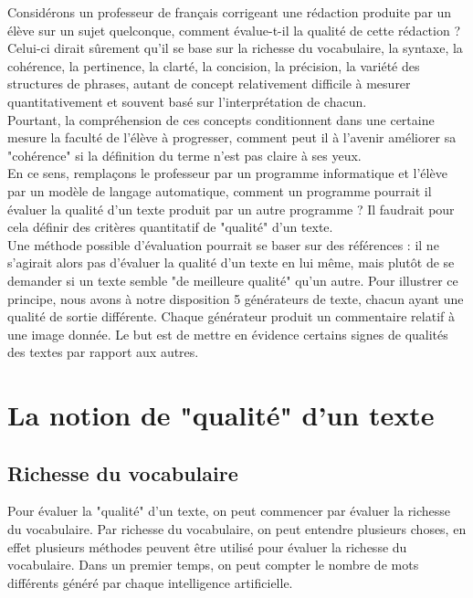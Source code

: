 \documentclass[conference]{IEEEtran}
\begin{document}
Considérons un professeur de français corrigeant une rédaction produite par un élève sur un sujet quelconque, comment évalue-t-il la qualité de cette rédaction ? 
Celui-ci dirait sûrement qu'il se base sur la richesse du vocabulaire, la syntaxe, la cohérence, la pertinence, la clarté, la concision, la précision, la variété des structures de phrases, autant de concept relativement difficile à mesurer quantitativement et souvent basé sur l'interprétation de chacun. \\

Pourtant, la compréhension de ces concepts conditionnent dans une certaine mesure la faculté de l'élève à progresser, comment peut il à l'avenir améliorer sa "cohérence" si la définition du terme n'est pas claire à ses yeux.\\

En ce sens, remplaçons le professeur par un programme informatique et l'élève par un modèle de langage automatique, comment un programme pourrait il évaluer la qualité d'un texte produit par un autre programme ?
Il faudrait pour cela définir des critères quantitatif de "qualité" d'un texte.\\

Une méthode possible d'évaluation pourrait se baser sur des références : il ne s'agirait alors pas d'évaluer la qualité d'un texte en lui même, mais plutôt de se demander si un texte semble "de meilleure qualité" qu'un autre.
Pour illustrer ce principe, nous avons à notre disposition 5 générateurs de texte, chacun ayant une qualité de sortie différente. Chaque générateur produit un commentaire relatif à une image donnée.
Le but est de mettre en évidence certains signes de qualités des textes par rapport aux autres.

\section {La notion de "qualité" d'un texte}

\subsection {Richesse du vocabulaire}

Pour évaluer la "qualité" d'un texte, on peut commencer par évaluer la richesse du vocabulaire. 
Par richesse du vocabulaire, on peut entendre plusieurs choses, en effet plusieurs méthodes peuvent être utilisé pour évaluer la richesse du vocabulaire. 
Dans un premier temps, on peut compter le nombre de mots différents généré par chaque intelligence artificielle. 
\end{document}
